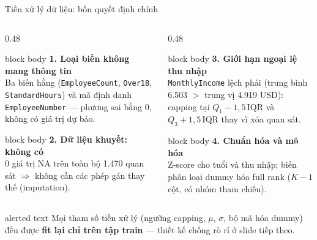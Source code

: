 \documentclass[10pt,aspectratio=169]{beamer}
\begin{document}
\begin{frame}{Tiền xử lý dữ liệu: bốn quyết định chính}
  \begin{columns}[T,onlytextwidth]
    \begin{column}{0.48\textwidth}
      \begin{beamercolorbox}[sep=0.16cm,rounded=true]{block body}
        \textbf{1. Loại biến không mang thông tin}\\[0.04cm]
        \small Ba biến hằng (\texttt{EmployeeCount}, \texttt{Over18},
        \texttt{StandardHours}) và mã định danh \texttt{EmployeeNumber}
        --- phương sai bằng 0, không có giá trị dự báo.
      \end{beamercolorbox}
      \vspace{0.16cm}
      \begin{beamercolorbox}[sep=0.16cm,rounded=true]{block body}
        \textbf{2. Dữ liệu khuyết: không có}\\[0.04cm]
        \small 0 giá trị NA trên toàn bộ 1.470 quan sát
        $\Rightarrow$ không cần các phép gán thay thế (imputation).
      \end{beamercolorbox}
    \end{column}
    \begin{column}{0.48\textwidth}
      \begin{beamercolorbox}[sep=0.16cm,rounded=true]{block body}
        \textbf{3. Giới hạn ngoại lệ thu nhập}\\[0.04cm]
        \small \texttt{MonthlyIncome} lệch phải (trung bình 6.503 $>$
        trung vị 4.919 USD): capping tại $Q_1-1{,}5\,\mathrm{IQR}$ và
        $Q_3+1{,}5\,\mathrm{IQR}$ thay vì xóa quan sát.
      \end{beamercolorbox}
      \vspace{0.16cm}
      \begin{beamercolorbox}[sep=0.16cm,rounded=true]{block body}
        \textbf{4. Chuẩn hóa và mã hóa}\\[0.04cm]
        \small Z-score cho tuổi và thu nhập; biến phân loại dummy hóa
        full rank ($K-1$ cột, có nhóm tham chiếu).
      \end{beamercolorbox}
    \end{column}
  \end{columns}
  \vspace{0.20cm}
  \begin{beamercolorbox}[sep=0.15cm,rounded=true]{alerted text}
    \centering\small
    Mọi tham số tiền xử lý (ngưỡng capping, $\mu$, $\sigma$, bộ mã hóa dummy)
    đều được \textbf{fit lại chỉ trên tập train} --- thiết kế chống rò rỉ
    ở slide tiếp theo.
  \end{beamercolorbox}
\end{frame}
\end{document}
